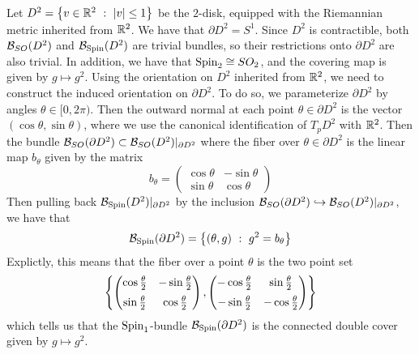 \begin{exmp}
Let $D^2 = \left\lbrace v \in \mathbb{R}^2 ~:~ |v| \leq 1 \right\rbrace$ be the $2$-disk, equipped with the
Riemannian metric inherited from $\mathbb{R}^2$. We have that $\partial D^2 = S^1$.
Since $D^2$ is contractible, both $\mathcal{B}_{SO}(D^2)$ and $\mathcal{B}_{\mathrm{Spin}}(D^2)$ are
trivial bundles, so their restrictions onto $\partial D^2$ are also trivial.
In addition, we have that $\mathrm{Spin}_2 \cong SO_2$, and the covering map is given
by $g \mapsto g^2$.
Using the orientation on $D^2$ inherited from $\mathbb{R}^2$, we need to construct
the induced orientation on $\partial D^2$. To do so, we parameterize
$\partial D^2$ by angles $\theta \in [0,2\pi)$. Then the outward normal
at each point $\theta \in \partial D^2$ is the vector $(\cos\theta, \sin\theta)$,
where we use the canonical identification of $T_pD^2$ with $\mathbb{R}^2$. Then
the bundle $\mathcal{B}_{SO}(\partial D^2) \subset \mathcal{B}_{SO}(D^2)\vert_{\partial D^2}$
where the fiber over $\theta \in \partial D^2$ is the linear map $b_\theta$ given
by the matrix
\[
b_\theta = \begin{pmatrix}
\cos\theta & -\sin\theta \\
\sin\theta & \cos\theta
\end{pmatrix}
\]
Then pulling back $\mathcal{B}_{\mathrm{Spin}}(D^2)\vert_{\partial D^2}$ by the inclusion
$\mathcal{B}_{SO}(\partial D^2) \hookrightarrow \mathcal{B}_{SO}(D^2)\vert_{\partial D^2}$,
we have that
\[
\mathcal{B}_{\mathrm{Spin}}(\partial D^2) = \left\lbrace (\theta, g) ~:~ g^2 = b_\theta \right\rbrace
\]
Explictly, this means that the fiber over a point $\theta$ is the two point set
\[
\left\lbrace \begin{pmatrix}
\cos\frac{\theta}{2} & -\sin\frac{\theta}{2} \\[5pt]
\sin\frac{\theta}{2} & \cos\frac{\theta}{2}
\end{pmatrix},
\begin{pmatrix}
-\cos\frac{\theta}{2} & \sin\frac{\theta}{2} \\[5pt]
-\sin\frac{\theta}{2} & -\cos\frac{\theta}{2}
\end{pmatrix} \right\rbrace
\]
which tells us that the $\mathrm{Spin}_1$-bundle $\mathcal{B}_{\mathrm{Spin}}(\partial D^2)$ is the
connected double cover given by $g \mapsto g^2$.
\end{exmp}
%

